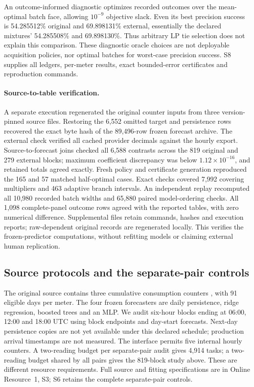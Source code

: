 \documentclass[12pt]{article}
\begin{document}
An outcome-informed diagnostic optimizes recorded outcomes over the
mean-optimal batch face, allowing $10^{-9}$ objective slack. Even its best
precision success is 54.285512\% original and 69.898131\% external,
essentially the declared mixtures' 54.285508\% and 69.898130\%.
Thus arbitrary LP tie selection does not explain this comparison. These
diagnostic oracle choices are not deployable acquisition policies, nor
optimal batches for worst-case precision success. S8 supplies all ledgers,
per-meter results, exact bounded-error certificates and reproduction commands.
\paragraph{Source-to-table verification.}
A separate execution regenerated the original counter inputs from three
version-pinned source files. Restoring the 6,552 omitted target and persistence
rows recovered the exact byte hash of the 89,496-row frozen forecast archive.
The external check verified all cached provider decimals against the hourly
export. Source-to-forecast joins checked all 6,588 contrasts across the
819 original and 279 external blocks; maximum coefficient discrepancy was below
$1.12\times10^{-16}$, and retained totals agreed exactly.
Fresh policy and certificate generation reproduced the 165 and 57 matched
half-optimal cases. Exact checks covered 7,992 covering multipliers and
463 adaptive branch intervals. An independent replay recomputed all 10,980
recorded batch widths and 65,880 paired model-ordering checks. All 1,098
complete-panel outcome rows agreed with the reported tables, with zero
numerical difference. Supplemental files retain commands, hashes and
execution reports; raw-dependent original records are regenerated locally.
This verifies the frozen-predictor computations, without refitting models
or claiming external human replication.
\subsection{Source protocols and the separate-pair controls}
\label{sec:counter-precision-results}
The original source contains three cumulative consumption counters
\citep{blem}, with 91 eligible days per meter. The four frozen forecasters
are daily persistence, ridge regression, boosted trees and an MLP. We audit
six-hour blocks ending at 06:00, 12:00 and 18:00 UTC using block endpoints
and day-start forecasts. Next-day persistence copies are not yet available
under this declared schedule; production arrival timestamps are not measured.
The interface permits five internal hourly counters. A two-reading budget
per separate-pair audit gives 4,914 tasks; a two-reading budget shared by
all pairs gives the 819-block study above. These are different resource
requirements. Full source and fitting specifications are in Online
Resource~1, S3; S6 retains the complete separate-pair controls.
\end{document}
